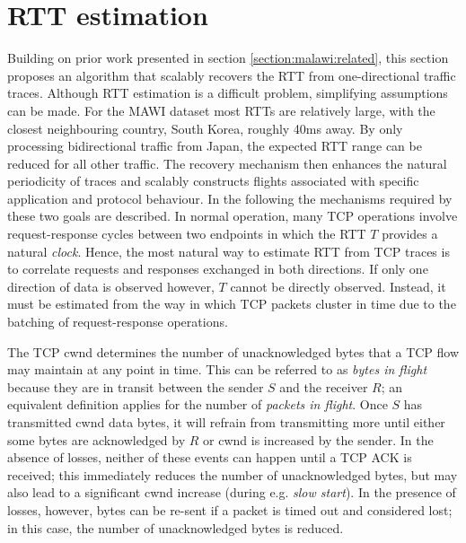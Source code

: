 
\section{\acs{RTT} estimation}
\label{section:malawi:rtt}

Building on prior work presented in section \ref{section:malawi:related}, this section proposes an algorithm that scalably recovers the \ac{RTT} from one-directional traffic traces. 
Although \ac{RTT} estimation is a difficult problem, simplifying assumptions can be made.
For the \acs{MAWI} dataset most \acp{RTT} are relatively large, with the closest neighbouring country, South Korea, roughly 40ms away.
By only processing bidirectional traffic from Japan, the expected \ac{RTT} range can be reduced for all other traffic.
The recovery mechanism then enhances the natural periodicity of traces and scalably constructs flights associated with specific application and protocol behaviour.
In the following the mechanisms required by these two goals are described. 
%
%
In normal operation, many \ac{TCP} operations involve request-response cycles between two endpoints in which the \ac{RTT} $T$ provides a natural \emph{clock}.
Hence, the most natural way to estimate \ac{RTT} from \ac{TCP} traces is to correlate requests and responses exchanged in both directions. 
If only one direction of data is observed however, $T$ cannot be directly observed. 
Instead, it must be estimated from the way in which \ac{TCP} packets cluster in time due to the batching of request-response operations.

The \ac{TCP} \ac{cwnd} determines the number of unacknowledged bytes that a \ac{TCP} flow may maintain at any point in time. 
This can be referred to as \emph{bytes in flight} because they are in transit between the sender $S$ and the receiver $R$; an equivalent definition applies for the number of \emph{packets in flight}. 
Once $S$ has transmitted \ac{cwnd} data bytes, it will refrain from transmitting more until either some bytes are acknowledged by $R$ or \ac{cwnd} is increased by the sender. 
In the absence of losses, neither of these events can happen until a \ac{TCP} \ac{ACK} is received; this immediately reduces the number of unacknowledged bytes, but may also lead to a significant \ac{cwnd} increase (during e.g. \emph{slow start}). 
In the presence of losses, however, bytes can be re-sent if a packet is timed out and considered lost; in this case, the number of unacknowledged bytes is reduced.

